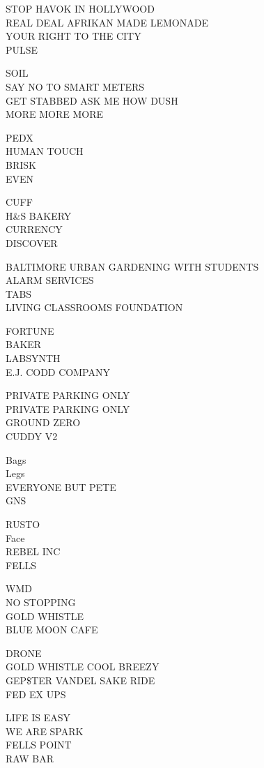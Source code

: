 \documentclass[10pt,letterpaper]{article}
\begin{document}
STOP HAVOK IN HOLLYWOOD\\
REAL DEAL AFRIKAN MADE LEMONADE\\
YOUR RIGHT TO THE CITY\\
PULSE

SOIL\\
SAY NO TO SMART METERS\\
GET STABBED ASK ME HOW DUSH\\
MORE MORE MORE

PEDX\\
HUMAN TOUCH\\
BRISK\\
EVEN

CUFF\\
H\&S BAKERY\\
CURRENCY\\
DISCOVER

BALTIMORE URBAN GARDENING WITH STUDENTS\\
ALARM SERVICES\\
TABS\\
LIVING CLASSROOMS FOUNDATION

FORTUNE\\
BAKER\\
LABSYNTH\\
E.J. CODD COMPANY

PRIVATE PARKING ONLY\\
PRIVATE PARKING ONLY\\
GROUND ZERO\\
CUDDY V2

Bags\\
Legs\\
EVERYONE BUT PETE\\
GNS

RUSTO\\
Face\\
REBEL INC\\
FELLS

WMD\\
NO STOPPING\\
GOLD WHISTLE\\
BLUE MOON CAFE

DRONE\\
GOLD WHISTLE COOL BREEZY\\
GEP\$TER VANDEL SAKE RIDE\\
FED EX UPS

LIFE IS EASY\\
WE ARE SPARK\\
FELLS POINT\\
RAW BAR
\end{document}
